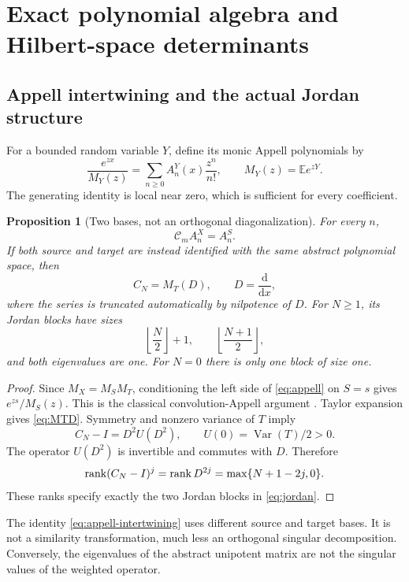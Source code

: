 \documentclass[11pt,a4paper]{article}
\numberwithin{equation}{section}
\newtheorem{proposition}[theorem]{Proposition}
\theoremstyle{definition}\newtheorem{definition}[theorem]{Definition}
\theoremstyle{remark}\newtheorem{remark}[theorem]{Remark}
\newcommand{\E}{\mathbb E}\newcommand{\Pp}{\mathbb P}
\newcommand{\Var}{\operatorname{Var}}\newcommand{\Cov}{\operatorname{Cov}}
\newcommand{\calC}{\mathcal C_m}\newcommand{\calP}{\mathcal P}
\begin{document}
\section{Exact polynomial algebra and Hilbert-space determinants}
\label{sec:polynomials}
\subsection{Appell intertwining and the actual Jordan structure}
For a bounded random variable $Y$, define its monic Appell polynomials by
\begin{equation}
 \frac{e^{zx}}{M_Y(z)}=\sum_{n\ge0}A_n^Y(x)\frac{z^n}{n!},
 \qquad M_Y(z)=\E e^{zY}.
 \label{eq:appell}
\end{equation}
The generating identity is local near zero, which is sufficient for every coefficient.
\begin{proposition}[Two bases, not an orthogonal diagonalization]
\label{prop:appell}
For every $n$,
\begin{equation}
 \calC A_n^X=A_n^S.
 \label{eq:appell-intertwining}
\end{equation}
If both source and target are instead identified with the same abstract polynomial space, then
\begin{equation}
 C_N=M_T(D),\qquad D=\frac{\mathrm d}{\mathrm dx},
 \label{eq:MTD}
\end{equation}
where the series is truncated automatically by nilpotence of $D$. For $N\ge1$, its Jordan blocks have sizes
\begin{equation}
 \left\lfloor\frac N2\right\rfloor+1,
 \qquad \left\lfloor\frac{N+1}{2}\right\rfloor,
 \label{eq:jordan}
\end{equation}
and both eigenvalues are one. For $N=0$ there is only one block of size one.
\end{proposition}
\begin{proof}
Since $M_X=M_SM_T$, conditioning the left side of \eqref{eq:appell} on $S=s$ gives $e^{zs}/M_S(z)$. This is the classical convolution-Appell argument \cite{anshelevich}. Taylor expansion gives \eqref{eq:MTD}. Symmetry and nonzero variance of $T$ imply
\[
 C_N-I=D^2U(D^2),\qquad U(0)=\Var(T)/2>0.
\]
The operator $U(D^2)$ is invertible and commutes with $D$. Therefore
\[
 \operatorname{rank}(C_N-I)^j=\operatorname{rank} D^{2j}=\max\{N+1-2j,0\}.
\]
These ranks specify exactly the two Jordan blocks in \eqref{eq:jordan}.
\end{proof}
The identity \eqref{eq:appell-intertwining} uses different source and target bases. It is not a similarity transformation, much less an orthogonal singular decomposition. Conversely, the eigenvalues of the abstract unipotent matrix are not the singular values of the weighted operator.
\end{document}
